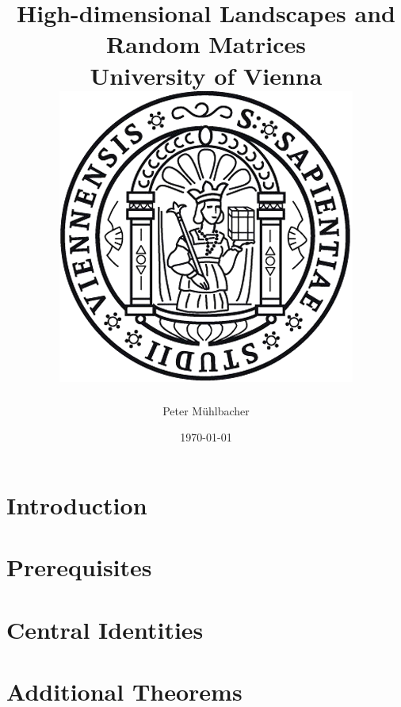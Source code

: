\documentclass[11pt]{report}
\begin{document}
\title{
	{High-dimensional Landscapes and Random Matrices}\\
	{\large University of Vienna}\\
	{\includegraphics{university.png}}
}
\author{Peter Mühlbacher}
\date{\today}
\maketitle

\begin{abstract}
\end{abstract}

\tableofcontents

\chapter*{Introduction}


\chapter{Prerequisites}\label{chap:prerequisites}


\chapter{Central Identities}\label{chap:centralidentities}


\appendix
\chapter{Additional Theorems}




\end{document}
